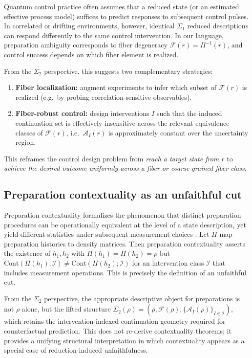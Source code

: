 Quantum control practice often assumes that a reduced state (or an estimated effective process
model) suffices to predict responses to subsequent control pulses. In correlated or drifting
environments, however, identical $\Sigma_1$ reduced descriptions can respond differently to the
same control intervention. In our language, preparation ambiguity corresponds to fiber
degeneracy $\mathcal{F}(r)=\Pi^{-1}(r)$, and control success depends on which fiber element is
realized.

From the $\Sigma_2$ perspective, this suggests two complementary strategies:
\begin{enumerate}
  \item \textbf{Fiber localization:} augment experiments to infer which subset of $\mathcal{F}(r)$
        is realized (e.g.\ by probing correlation-sensitive observables).
  \item \textbf{Fiber-robust control:} design interventions $I$ such that the induced continuation
        set is effectively insensitive across the relevant equivalence classes of $\mathcal{F}(r)$,
        i.e.\ $\mathcal{A}_I(r)$ is approximately constant over the uncertainty region.
\end{enumerate}
This reframes the control design problem from \emph{reach a target state from $r$} to
\emph{achieve the desired outcome uniformly across a fiber or coarse-grained fiber class}.

\subsection{Preparation contextuality as an unfaithful cut}
\label{sec:contextuality}

Preparation contextuality formalizes the phenomenon that distinct preparation procedures can be
operationally equivalent at the level of a state description, yet yield different statistics
under subsequent measurement choices \cite{Spekkens2005}. Let $\Pi$ map preparation histories
to density matrices. Then preparation contextuality asserts the existence of $h_1,h_2$ with
$\Pi(h_1)=\Pi(h_2)=\rho$ but
$\mathrm{Cont}(\Pi(h_1);\mathcal{I})\neq\mathrm{Cont}(\Pi(h_2);\mathcal{I})$
for an intervention class $\mathcal{I}$ that includes measurement operations. This is precisely
the definition of an unfaithful cut.

From the $\Sigma_2$ perspective, the appropriate descriptive object for preparations is not
$\rho$ alone, but the lifted structure
$\Sigma_2(\rho)=(\rho,\mathcal{F}(\rho),\{\mathcal{A}_I(\rho)\}_{I\in\mathcal{I}})$,
which retains the intervention-indexed continuation geometry required for counterfactual
prediction. This does not re-derive contextuality theorems; it provides a unifying structural
interpretation in which contextuality appears as a special case of reduction-induced
unfaithfulness.

